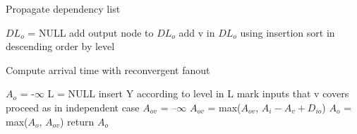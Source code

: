\documentclass[journal,12pt]{IEEEtran}
\begin{document}
\begin{algorithm}
  \caption{Propagate dependency list}\label{lst:dl_prop}
  \begin{algorithmic}
    \State $DL_o$ = NULL
      \State add output node to $DL_o$
    \EndIf
        \State add v in $DL_o$ using insertion sort
        \State in descending order by level
      \EndFor
    \EndFor
\end{algorithmic}
\end{algorithm}


\begin{algorithm}
  \caption{Compute arrival time with reconvergent fanout}\label{lst:reconverge}
  \begin{algorithmic}
    \State $A_o$ = -$\infty$
      \State L = NULL
          \State insert Y according to level in L
          \State mark inputs that v covers
        \EndIf
      \EndFor
    \EndFor
      \State proceed as in independent case
    \Else
        \State $A_{ov}$ = --$\infty$
          \State  $A_{ov}$ = max($A_{ov}$, $A_i - A_v + D_{io}$)
        \EndFor
        \State $A_o$ = max($A_o$, $A_{ov}$)
      \EndFor
    \EndIf
    \State return $A_o$
\end{algorithmic}
\end{algorithm}
\end{document}

